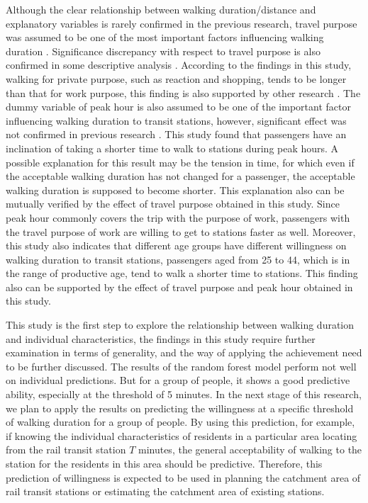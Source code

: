 \documentclass[Journal,letterpaper]{ascelike-new}
\begin{document}
%
Although the clear relationship between walking duration/distance and explanatory variables is rarely confirmed in the previous research, travel purpose was assumed to be one of the most important factors influencing walking duration \cite{krygsman2004multimodal,yang2012walking}. Significance discrepancy with respect to travel purpose is also confirmed in some descriptive analysis \cite{burke2007distances,hoback2008true}. According to the findings in this study, walking for private purpose, such as reaction and shopping, tends to be longer than that for work purpose, this finding is also supported by other research \cite{yang2012walking}. The dummy variable of peak hour is also assumed to be one of the important factor influencing walking duration to transit stations, however, significant effect was not confirmed in previous research \cite{daniels2013explaining,krygsman2004multimodal}. This study found that passengers have an inclination of taking a shorter time to walk to stations during peak hours. A possible explanation for this result may be the tension in time, for which even if the acceptable walking duration has not changed for a passenger, the acceptable walking duration is supposed to become shorter. This explanation also can be mutually verified by the effect of travel purpose obtained in this study. Since peak hour commonly covers the trip with the purpose of work, passengers with the travel purpose of work are willing to get to stations faster as well. Moreover, this study also indicates that different age groups have different willingness on walking duration to transit stations, passengers aged from 25 to 44, which is in the range of productive age, tend to walk a shorter time to stations. This finding also can be supported by the effect of travel purpose and peak hour obtained in this study.


This study is the first step to explore the relationship between walking duration and individual characteristics, the findings in this study require further examination in terms of generality, and the way of applying the achievement need to be further discussed. The results of the random forest model perform not well on individual predictions. But for a group of people, it shows a good predictive ability, especially at the threshold of 5 minutes. In the next stage of this research, we plan to apply the results on predicting the willingness at a specific threshold of walking duration for a group of people. By using this prediction, for example, if knowing the individual characteristics of residents in a particular area locating from the rail transit station $T$ minutes, the general acceptability of walking to the station for the residents in this area should be predictive. Therefore, this prediction of willingness is expected to be used in planning the catchment area of rail transit stations or estimating the catchment area of existing stations.
\end{document}

